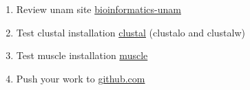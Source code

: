 \documentclass{beamer}
\begin{document}
\begin{frame}

\begin{enumerate}

\item
   Review unam site \href{https://www.ccg.unam.mx/~vinuesa/tlem/programa_TLEM.html}{bioinformatics-unam}
\item 
   Test clustal installation \href{http://www.clustal.org/}{clustal} (clustalo and clustalw)
\item 
   Test muscle installation \href{https://www.drive5.com/muscle/}{muscle}
\item
	Push your work to \href{https://github.com}{github.com}

\end{enumerate} 


\end{frame}
\end{document}
